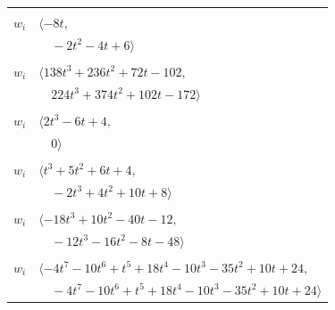 \documentclass[11pt]{article}
\begin{document}
\begin{longtable}{@{}ll@{}}
\addlinespace[2pt]
\multicolumn{2}{@{}p{0.97\textwidth}@{}}{$i=5$, $D_i=1$, $\rho_{ij}$: $0{:}1, \allowbreak 8{:}2, \allowbreak 10{:}1, \allowbreak 18{:}1, \allowbreak 26{:}1, \allowbreak 28{:}2$}\\
$w_i$ & $\langle -8t,$\\
 & $\quad -2t^{2}-4t+6\rangle$\\
\addlinespace[2pt]
\multicolumn{2}{@{}p{0.97\textwidth}@{}}{$i=6$, $D_i=1$, $\rho_{ij}$: $2{:}2, \allowbreak 3{:}2, \allowbreak 10{:}1, \allowbreak 11{:}2, \allowbreak 14{:}1, \allowbreak 22{:}1, \allowbreak 23{:}1, \allowbreak 26{:}1, \allowbreak 28{:}1, \allowbreak 29{:}2$}\\
$w_i$ & $\langle 138t^{3}+236t^{2}+72t-102,$\\
 & $\quad 224t^{3}+374t^{2}+102t-172\rangle$\\
\addlinespace[2pt]
\multicolumn{2}{@{}p{0.97\textwidth}@{}}{$i=7$, $D_i=1$, $\rho_{ij}$: $10{:}2, \allowbreak 15{:}1, \allowbreak 22{:}2, \allowbreak 23{:}2$}\\
$w_i$ & $\langle 2t^{3}-6t+4,$\\
 & $\quad 0\rangle$\\
\addlinespace[2pt]
\multicolumn{2}{@{}p{0.97\textwidth}@{}}{$i=8$, $D_i=1$, $\rho_{ij}$: $1{:}1, \allowbreak 2{:}2, \allowbreak 3{:}2, \allowbreak 4{:}2, \allowbreak 5{:}1, \allowbreak 14{:}1, \allowbreak 21{:}1, \allowbreak 24{:}1$}\\
$w_i$ & $\langle t^{3}+5t^{2}+6t+4,$\\
 & $\quad -2t^{3}+4t^{2}+10t+8\rangle$\\
\addlinespace[2pt]
\multicolumn{2}{@{}p{0.97\textwidth}@{}}{$i=9$, $D_i=1$, $\rho_{ij}$: $0{:}1, \allowbreak 3{:}2, \allowbreak 10{:}1, \allowbreak 13{:}2, \allowbreak 15{:}2, \allowbreak 23{:}2, \allowbreak 25{:}1, \allowbreak 30{:}2, \allowbreak 32{:}1$}\\
$w_i$ & $\langle -18t^{3}+10t^{2}-40t-12,$\\
 & $\quad -12t^{3}-16t^{2}-8t-48\rangle$\\
\addlinespace[2pt]
\multicolumn{2}{@{}p{0.97\textwidth}@{}}{$i=10$, $D_i=1$, $\rho_{ij}$: $4{:}2, \allowbreak 5{:}2, \allowbreak 6{:}2, \allowbreak 7{:}1, \allowbreak 9{:}2, \allowbreak 18{:}2, \allowbreak 20{:}2, \allowbreak 21{:}2, \allowbreak 26{:}2, \allowbreak 29{:}2$}\\
$w_i$ & $\langle -4t^{7}-10t^{6}+t^{5}+18t^{4}-10t^{3}-35t^{2}+10t+24,$\\
 & $\quad -4t^{7}-10t^{6}+t^{5}+18t^{4}-10t^{3}-35t^{2}+10t+24\rangle$\\

\end{longtable}
\end{document}
